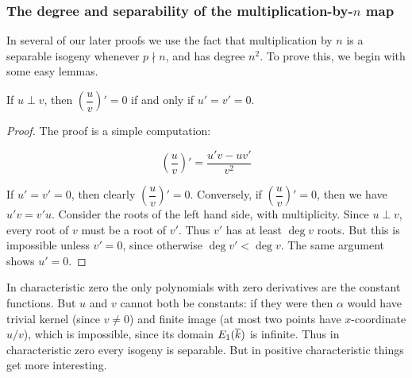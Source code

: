 %


\subsubsection{The degree and separability of the multiplication-by-\texorpdfstring{$n$}{} map}
In several of our later proofs we use the fact that multiplication by $n$ is a separable isogeny whenever $p\nmid n$, and has degree $n^2$.
To prove this, we begin with some easy lemmas.

\begin{lem}\label{quoderiv0lma}
If $u\perp v$, then $\left(\dfrac{u}{v}\right)'=0$ if and only if $u'=v'=0$.
\end{lem}

\begin{proof}
The proof is a simple computation:

$$\left(\dfrac{u}{v}\right)'=\dfrac{u'v-uv'}{v^2}$$

If $u'=v'=0$, then clearly $\left(\dfrac{u}{v}\right)'=0$. Conversely, if $\left(\dfrac{u}{v}\right)'=0$, then we have $u'v=v'u$. Consider the roots of the left hand side, with multiplicity. Since $u\perp v$, every root of $v$ must be a root of $v'$. Thus $v'$ has at least $\deg v$ roots.
But this is impossible unless $v'=0$, since otherwise $\deg v' < \deg v$.
The same argument shows $u'=0$.
\end{proof}

In characteristic zero the only polynomials with zero derivatives are the constant functions.
But $u$ and $v$ cannot both be constants: if they were then $\alpha$ would have trivial kernel (since $v\ne 0$) and finite image (at most two points have $x$-coordinate $u/v$), which is impossible, since its domain $E_1(\overline{k})$ is infinite.
Thus in characteristic zero every isogeny is separable.  But in positive characteristic things get more interesting.

